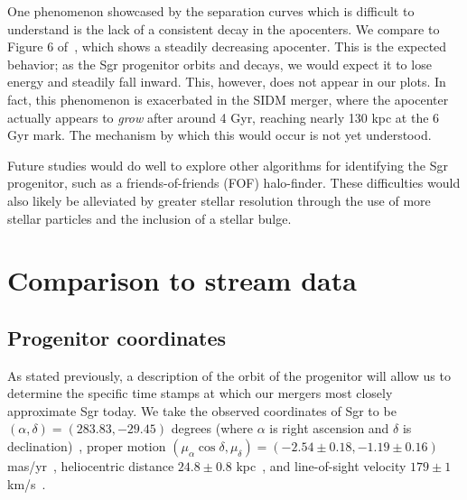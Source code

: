 One phenomenon showcased by the separation curves which is difficult to
understand is the lack of a consistent decay in the apocenters.  We compare to
Figure 6 of~\cite{dierickx_predicted_2017}, which shows a steadily decreasing
apocenter.  This is the expected behavior; as the Sgr progenitor orbits and
decays, we would expect it to lose energy and steadily fall inward.  This,
however, does not appear in our plots.  In fact, this phenomenon is
exacerbated in the SIDM merger, where the apocenter actually appears to
\textit{grow} after around 4 Gyr, reaching nearly 130 kpc at the 6 Gyr mark.
The mechanism by which this would occur is not yet understood.

Future studies would do well to explore other algorithms for identifying the Sgr
progenitor, such as a friends-of-friends (FOF) halo-finder. These difficulties
would also likely be alleviated by greater stellar resolution through the use of
more stellar particles and the inclusion of a stellar bulge. 


\hypertarget{comparison-to-stream-data}{%
\section{Comparison to stream data}\label{comparison-to-stream-data}}

\hypertarget{progenitor-coordinates}{%
\subsection{Progenitor coordinates}\label{progenitor-coordinates}}

As stated previously, a description of the orbit of the progenitor will allow us
to determine the specific time stamps at which our mergers most closely
approximate Sgr today.  We take the observed coordinates of Sgr to be
$(\alpha, \delta) = (283.83, -29.45)$ degrees (where $\alpha$ is right
ascension and $\delta$ is declination)~\cite{nasa_nasaipac_nodate}, proper
motion $(\mu_\alpha \cos\delta, \mu_\delta) = (-2.54 \pm 0.18, -1.19 \pm
0.16)$ mas/yr~\cite{massari_hubble_2013}, heliocentric distance $24.8 \pm 0.8$
kpc~\cite{kunder_distance_2009}, and line-of-sight velocity $179 \pm 1$
km/s~\cite{dierickx_predicted_2017,bellazzini_nucleus_2008}.  


